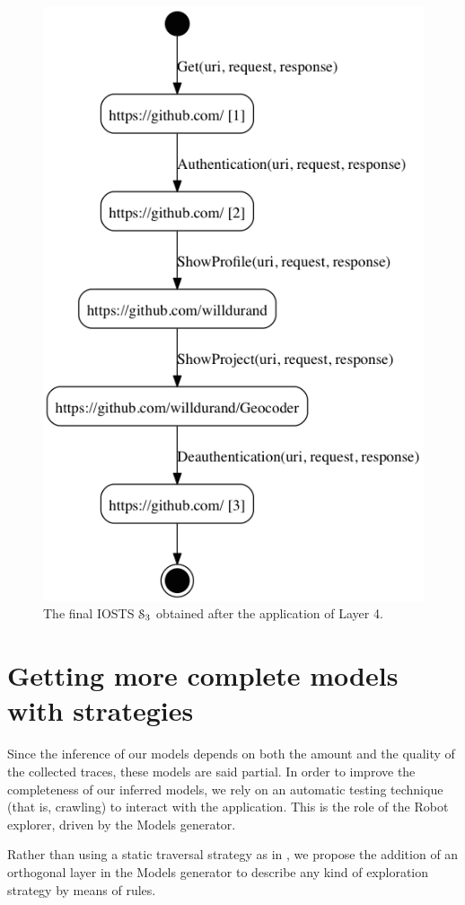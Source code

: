 \begin{figure}[ht]
    \begin{center}
    \includegraphics[width=0.6\linewidth]{figures/gh-iosts-41.png}
    \caption{The final IOSTS $\EuScript{S}_3$ obtained after the
    application of Layer 4.}
    \label{fig:github:iosts:4}
    \end{center}
\end{figure}


\section{Getting more complete models with strategies}
\label{sec:modelinf:webapps:strategy}

Since the inference of our models depends on both the amount and
the quality of the collected traces, these models are said
partial. In order to improve the completeness of our inferred
models, we rely on an automatic testing technique (that is,
crawling) to interact with the application. This is the role of
the Robot explorer, driven by the Models generator.

Rather than using a static traversal strategy as in
\cite{Memon:2003,concolicandroid12,crawljax:tweb12,
Amalfitano:2012:UGR:2351676.2351717, WPX13}, we propose the
addition of an orthogonal layer in the Models generator to
describe any kind of exploration strategy by means of rules.


